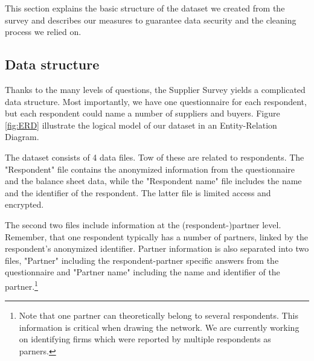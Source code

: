 \documentclass[final, dvipsnames, authoryear,12pt]{elsarticle}
\begin{document}
This section explains the basic structure of the dataset we created from the survey and describes our measures to guarantee data security and the cleaning process we relied on. 

\subsection{Data structure} 

Thanks to the many levels of questions, the Supplier Survey yields a complicated data structure. Most importantly, we have one questionnaire for each respondent, but each respondent could name a number of suppliers and buyers.  Figure \ref{fig:ERD} illustrate the logical model of our dataset in an Entity-Relation Diagram.



The dataset consists of 4 data files. Tow of these are related to respondents. The "Respondent" file contains the anonymized information from the questionnaire and the balance sheet data, while the "Respondent name" file includes the name and the identifier of the respondent. The latter file is limited access and encrypted. 

The second two files include information at the (respondent-)partner level. Remember, that one respondent typically has a number of partners, linked by the respondent's anonymized identifier. Partner information is also separated into two files, "Partner" including the respondent-partner specific answers from the questionnaire and "Partner name" including the name and identifier of the partner.\footnote{Note that one partner can theoretically belong to several respondents. This information is critical when drawing the network. We are currently working on identifying firms which were reported by multiple respondents as parners.}
\end{document}
